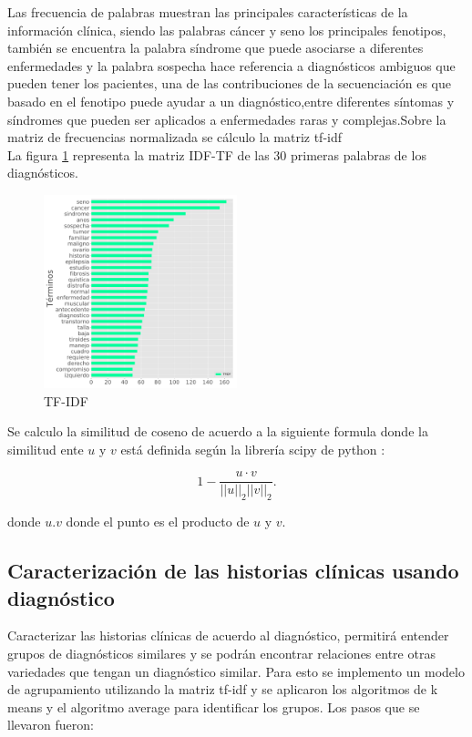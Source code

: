 Las frecuencia de palabras muestran las principales características de la información clínica, siendo las palabras cáncer y seno los principales fenotipos, también se encuentra la palabra síndrome que puede asociarse a diferentes  enfermedades y la palabra sospecha hace referencia a diagnósticos ambiguos que pueden tener los pacientes, una de las contribuciones de la secuenciación es que basado en el fenotipo puede ayudar a un diagnóstico,entre diferentes síntomas y síndromes que pueden ser aplicados a enfermedades raras y complejas\cite{Tetreault2015a}.Sobre  la matriz  de frecuencias normalizada se cálculo la matriz tf-idf \\

La figura \ref{fig:IDFTF} representa la matriz IDF-TF de las 30 primeras palabras de los diagnósticos.  

\begin{figure}[H] 
	\centering
	\includegraphics[width=0.5\textwidth]{Kap4/tfidf.pdf}
	\caption{TF-IDF} 
	\label{fig:IDFTF}
\end{figure}

Se calculo la similitud de coseno de acuerdo a la siguiente formula donde la similitud ente $u$  y $v$ está definida según la librería scipy de python \cite{scipy}:

$$   1 - \frac{u \cdot v}
{||u||_2 ||v||_2}. $$

donde $u.v$ donde el punto es el producto de $u$ y $v$.


\subsection{Caracterización de las historias clínicas usando diagnóstico}

Caracterizar las historias clínicas  de acuerdo al diagnóstico, permitirá entender grupos de diagnósticos similares y se podrán encontrar relaciones entre otras variedades que tengan un diagnóstico similar. Para esto se implemento un modelo de agrupamiento utilizando la matriz tf-idf y se aplicaron los algoritmos de k means y el algoritmo average  para identificar los grupos. Los pasos que se llevaron fueron:

